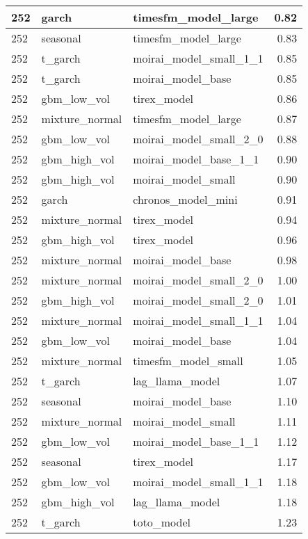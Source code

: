 {\begin{tabular}{lllr}
\midrule
252 & garch & timesfm\_model\_large & 0.82 \\
\midrule
252 & seasonal & timesfm\_model\_large & 0.83 \\
\midrule
252 & t\_garch & moirai\_model\_small\_1\_1 & 0.85 \\
\midrule
252 & t\_garch & moirai\_model\_base & 0.85 \\
\midrule
252 & gbm\_low\_vol & tirex\_model & 0.86 \\
\midrule
252 & mixture\_normal & timesfm\_model\_large & 0.87 \\
\midrule
252 & gbm\_low\_vol & moirai\_model\_small\_2\_0 & 0.88 \\
\midrule
252 & gbm\_high\_vol & moirai\_model\_base\_1\_1 & 0.90 \\
\midrule
252 & gbm\_high\_vol & moirai\_model\_small & 0.90 \\
\midrule
252 & garch & chronos\_model\_mini & 0.91 \\
\midrule
252 & mixture\_normal & tirex\_model & 0.94 \\
\midrule
252 & gbm\_high\_vol & tirex\_model & 0.96 \\
\midrule
252 & mixture\_normal & moirai\_model\_base & 0.98 \\
\midrule
252 & mixture\_normal & moirai\_model\_small\_2\_0 & 1.00 \\
\midrule
252 & gbm\_high\_vol & moirai\_model\_small\_2\_0 & 1.01 \\
\midrule
252 & mixture\_normal & moirai\_model\_small\_1\_1 & 1.04 \\
\midrule
252 & gbm\_low\_vol & moirai\_model\_base & 1.04 \\
\midrule
252 & mixture\_normal & timesfm\_model\_small & 1.05 \\
\midrule
252 & t\_garch & lag\_llama\_model & 1.07 \\
\midrule
252 & seasonal & moirai\_model\_base & 1.10 \\
\midrule
252 & mixture\_normal & moirai\_model\_small & 1.11 \\
\midrule
252 & gbm\_low\_vol & moirai\_model\_base\_1\_1 & 1.12 \\
\midrule
252 & seasonal & tirex\_model & 1.17 \\
\midrule
252 & gbm\_low\_vol & moirai\_model\_small\_1\_1 & 1.18 \\
\midrule
252 & gbm\_high\_vol & lag\_llama\_model & 1.18 \\
\midrule
252 & t\_garch & toto\_model & 1.23 \\

\end{tabular}}
